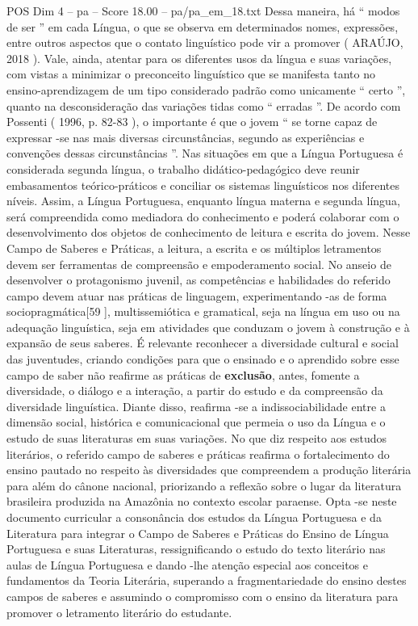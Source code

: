 \begin{textsample}{POS Dim 4 – pa – Score 18.00 – pa/pa\_em\_18.txt}
Dessa maneira, há “ modos de ser ” em cada Língua, o que se observa em determinados nomes, expressões, entre outros aspectos que o contato linguístico pode vir a promover ( ARAÚJO, 2018 ).
Vale, ainda, atentar para os diferentes usos da língua e suas variações, com vistas a minimizar o preconceito linguístico que se manifesta tanto no ensino-aprendizagem de um tipo considerado padrão como unicamente “ certo ”, quanto na desconsideração das variações tidas como “ erradas ”.
De acordo com Possenti ( 1996, p. 82-83 ), o importante é que o jovem “ se torne capaz de expressar -se nas mais diversas circunstâncias, segundo as experiências e convenções dessas circunstâncias ”.
Nas situações em que a Língua Portuguesa é considerada segunda língua, o trabalho didático-pedagógico deve reunir embasamentos teórico-práticos e conciliar os sistemas linguísticos nos diferentes níveis.
Assim, a Língua Portuguesa, enquanto língua materna e segunda língua, será compreendida como mediadora do conhecimento e poderá colaborar com o desenvolvimento dos objetos de conhecimento de leitura e escrita do jovem.
Nesse Campo de Saberes e Práticas, a leitura, a escrita e os múltiplos letramentos devem ser ferramentas de compreensão e empoderamento social.
No anseio de desenvolver o protagonismo juvenil, as competências e habilidades do referido campo devem atuar nas práticas de linguagem, experimentando -as de forma sociopragmática[59 ], multissemiótica e gramatical, seja na língua em uso ou na adequação linguística, seja em atividades que conduzam o jovem à construção e à expansão de seus saberes.
É relevante reconhecer a diversidade cultural e social das juventudes, criando condições para que o ensinado e o aprendido sobre esse campo de saber não reafirme as práticas de \textbf{exclusão}, antes, fomente a diversidade, o diálogo e a interação, a partir do estudo e da compreensão da diversidade linguística.
Diante disso, reafirma -se a indissociabilidade entre a dimensão social, histórica e comunicacional que permeia o uso da Língua e o estudo de suas literaturas em suas variações.
No que diz respeito aos estudos literários, o referido campo de saberes e práticas reafirma o fortalecimento do ensino pautado no respeito às diversidades que compreendem a produção literária para além do cânone nacional, priorizando a reflexão sobre o lugar da literatura brasileira produzida na Amazônia no contexto escolar paraense.
Opta -se neste documento curricular a consonância dos estudos da Língua Portuguesa e da Literatura para integrar o Campo de Saberes e Práticas do Ensino de Língua Portuguesa e suas Literaturas, ressignificando o estudo do texto literário nas aulas de Língua Portuguesa e dando -lhe atenção especial aos conceitos e fundamentos da Teoria Literária, superando a fragmentariedade do ensino destes campos de saberes e assumindo o compromisso com o ensino da literatura para promover o letramento literário do estudante.

\end{textsample}
